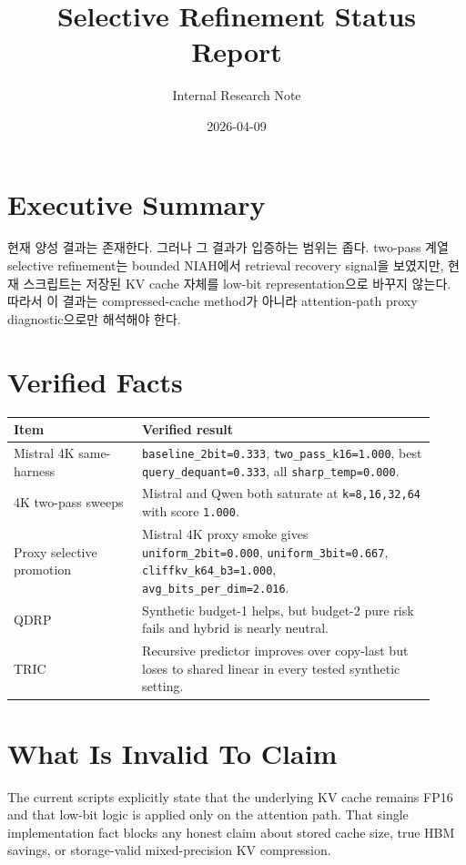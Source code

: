 \documentclass[11pt]{article}
\title{Selective Refinement Status Report}
\author{Internal Research Note}
\date{2026-04-09}
\begin{document}
\maketitle

\section{Executive Summary}

현재 양성 결과는 존재한다. 그러나 그 결과가 입증하는 범위는 좁다. two-pass 계열 selective refinement는 bounded NIAH에서 retrieval recovery signal을 보였지만, 현재 스크립트는 저장된 KV cache 자체를 low-bit representation으로 바꾸지 않는다. 따라서 이 결과는 compressed-cache method가 아니라 attention-path proxy diagnostic으로만 해석해야 한다.

\section{Verified Facts}

\begin{tabular}{>{\raggedright\arraybackslash}p{0.28\linewidth} >{\raggedright\arraybackslash}p{0.64\linewidth}}
\toprule
Item & Verified result \\
\midrule
Mistral 4K same-harness & \texttt{baseline\_2bit=0.333}, \texttt{two\_pass\_k16=1.000}, best \texttt{query\_dequant=0.333}, all \texttt{sharp\_temp=0.000}. \\
4K two-pass sweeps & Mistral and Qwen both saturate at \texttt{k=8,16,32,64} with score \texttt{1.000}. \\
Proxy selective promotion & Mistral 4K proxy smoke gives \texttt{uniform\_2bit=0.000}, \texttt{uniform\_3bit=0.667}, \texttt{cliffkv\_k64\_b3=1.000}, \texttt{avg\_bits\_per\_dim=2.016}. \\
QDRP & Synthetic budget-1 helps, but budget-2 pure risk fails and hybrid is nearly neutral. \\
TRIC & Recursive predictor improves over copy-last but loses to shared linear in every tested synthetic setting. \\
\bottomrule
\end{tabular}

\section{What Is Invalid To Claim}

The current scripts explicitly state that the underlying KV cache remains FP16 and that low-bit logic is applied only on the attention path. That single implementation fact blocks any honest claim about stored cache size, true HBM savings, or storage-valid mixed-precision KV compression.
\end{document}
